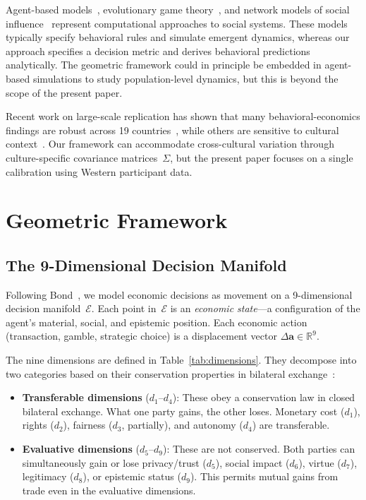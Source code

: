 \documentclass[journal]{IEEEtran}
\newcommand{\E}{\mathcal{E}}               %
\begin{document}
Agent-based models~\cite{epstein2006}, evolutionary game theory~\cite{nowak2006}, and network models of social influence~\cite{jackson2008} represent computational approaches to social systems.
These models typically specify behavioral rules and simulate emergent dynamics, whereas our approach specifies a decision metric and derives behavioral predictions analytically.
The geometric framework could in principle be embedded in agent-based simulations to study population-level dynamics, but this is beyond the scope of the present paper.

Recent work on large-scale replication has shown that many behavioral-economics findings are robust across 19 countries~\cite{ruggeri2020}, while others are sensitive to cultural context~\cite{henrich2010}.
Our framework can accommodate cross-cultural variation through culture-specific covariance matrices~$\Sigma$, but the present paper focuses on a single calibration using Western participant data.


\section{Geometric Framework}
\label{sec:framework}

\subsection{The 9-Dimensional Decision Manifold}

Following Bond~\cite{bond2026geometric,bond2026GE}, we model economic decisions as movement on a 9-dimensional decision manifold~$\E$.
Each point in~$\E$ is an \emph{economic state}---a configuration of the agent's material, social, and epistemic position.
Each economic action (transaction, gamble, strategic choice) is a displacement vector $\Delta \mathbf{a} \in \mathbb{R}^9$.

The nine dimensions are defined in Table~\ref{tab:dimensions}.
They decompose into two categories based on their conservation properties in bilateral exchange~\cite{bond2026GE}:
\begin{itemize}
    \item \textbf{Transferable dimensions} ($d_1$--$d_4$): These obey a conservation law in closed bilateral exchange.
    What one party gains, the other loses.
    Monetary cost ($d_1$), rights ($d_2$), fairness ($d_3$, partially), and autonomy ($d_4$) are transferable.
    \item \textbf{Evaluative dimensions} ($d_5$--$d_9$): These are not conserved.
    Both parties can simultaneously gain or lose privacy/trust ($d_5$), social impact ($d_6$), virtue ($d_7$), legitimacy ($d_8$), or epistemic status ($d_9$).
    This permits mutual gains from trade even in the evaluative dimensions.
\end{itemize}
\end{document}
